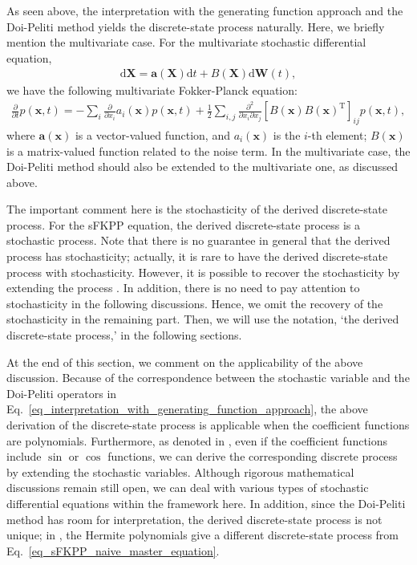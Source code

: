 \documentclass[sn-mathphys,Numbered]{sn-jnl}%
\theoremstyle{thmstyleone}%
\theoremstyle{thmstyletwo}%
\theoremstyle{thmstylethree}%
\begin{document}
As seen above, the interpretation with the generating function approach and the Doi-Peliti method yields the discrete-state process naturally. Here, we briefly mention the multivariate case. For the multivariate stochastic differential equation,
\begin{align}
\mathrm{d}\bm{X} = \bm{a}(\bm{X})\mathrm{d}t + B(\bm{X})\mathrm{d}\bm{W}(t),
\end{align} 
we have the following multivariate Fokker-Planck equation:
\begin{align}
\frac{\partial}{\partial t}p(\bm{x},t) = 
 -\sum_{i}\frac{\partial}{\partial x_i}a_i(\bm{x}) p(\bm{x},t) + \frac{1}{2}\sum_{i,j}\frac{\partial^2}{\partial x_i\partial x_j}[B(\bm{x})B(\bm{x})^{\mathrm{T}}]_{ij} p(\bm{x},t),
\end{align}
where $\bm{a}(\bm{x})$ is a vector-valued function, and $a_i(\bm{x})$ is the $i$-th element; $B(\bm{x})$ is a matrix-valued function related to the noise term. In the multivariate case, the Doi-Peliti method should also be extended to the multivariate one, as discussed above. 

The important comment here is the stochasticity of the derived discrete-state process. For the sFKPP equation, the derived discrete-state process is a stochastic process. Note that there is no guarantee in general that the derived process has stochasticity; actually, it is rare to have the derived discrete-state process with stochasticity. However, it is possible to recover the stochasticity by extending the process \cite{Ohkubo2013}. In addition, there is no need to pay attention to stochasticity in the following discussions. Hence, we omit the recovery of the stochasticity in the remaining part. Then, we will use the notation, `the derived discrete-state process,' in the following sections.


At the end of this section, we comment on the applicability of the above discussion. Because of the correspondence between the stochastic variable and the Doi-Peliti operators in Eq.~\eqref{eq_interpretation_with_generating_function_approach}, the above derivation of the discrete-state process is applicable when the coefficient functions are polynomials. Furthermore, as denoted in \cite{Ohkubo2013}, even if the coefficient functions include $\sin$ or $\cos$ functions, we can derive the corresponding discrete process by extending the stochastic variables. Although rigorous mathematical discussions remain still open, we can deal with various types of stochastic differential equations within the framework here. In addition, since the Doi-Peliti method has room for interpretation, the derived discrete-state process is not unique; in \cite{Ohkubo2019}, the Hermite polynomials give a different discrete-state process from Eq.~\eqref{eq_sFKPP_naive_master_equation}. 
\end{document}
